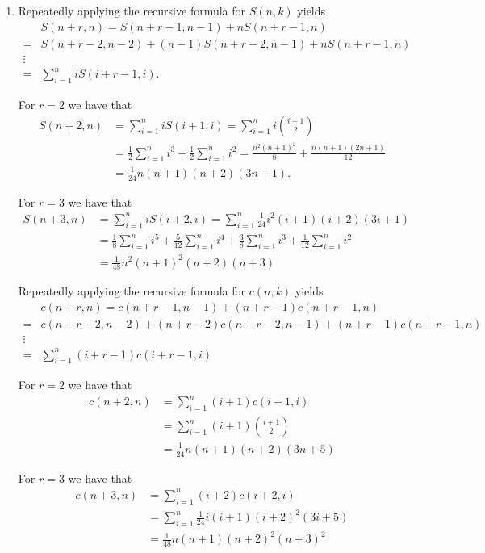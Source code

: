 \documentclass{article}
\begin{document}
\begin{enumerate}
      \item Repeatedly applying the recursive formula for $S(n, k)$ yields 
      \begin{align*}
         &S(n+r, n) = S(n+r-1, n-1) + nS(n+r-1, n) \\
         = &S(n+r-2, n-2) + (n-1)S(n+r-2, n-1) + nS(n+r-1, n) \\
         \vdots \\
         = &\sum_{i=1}^n i S(i+r-1 , i).
      \end{align*}

      For $r=2$ we have that 
      \begin{align*}
         S(n+2, n) 
         &= \sum_{i=1}^n i S(i+1 , i) 
            = \sum_{i=1}^n i \binom{i+1}{2} \\
         &= \frac{1}{2}\sum_{i=1}^n i^3 + \frac{1}{2} \sum_{i=1}^n i^2 
            = \frac{n^2(n+1)^2}{8} +  \frac{n(n+1)(2n+1)}{12} \\
         &= \frac{1}{24}n(n+1)(n+2)(3n+1).
      \end{align*}

      For $r=3$ we have that 
      \begin{align*}
         S(n+3, n) 
         &= \sum_{i=1}^n i S(i+2 , i) 
            = \sum_{i=1}^n \frac{1}{24}i^2(i+1)(i+2)(3i+1) \\
         &= \frac{1}{8}\sum_{i=1}^n i^5 + \frac{5}{12} \sum_{i=1}^n i^4
            + \frac{3}{8}\sum_{i=1}^n i^3 + \frac{1}{12} \sum_{i=1}^n i^2 \\
         &= \frac{1}{48}n^2(n+1)^2(n+2)(n+3)
      \end{align*}

      Repeatedly applying the recursive formula for $c(n, k)$ yields 
      \begin{align*}
         &c(n+r, n) = c(n+r-1, n-1) + (n+r-1)c(n+r-1, n) \\
         = &c(n+r-2, n-2) + (n+r-2)c(n+r-2, n-1) + (n+r-1)c(n+r-1, n) \\
         \vdots \\
         = &\sum_{i=1}^{n} (i+r-1) c(i+r-1 , i)
      \end{align*}

      For $r=2$ we have that 
      \begin{align*}
         c(n+2, n) &= \sum_{i=1}^{n} (i+1) c(i+1, i) \\
         &= \sum_{i=1}^{n} (i+1) \binom{i+1}{2} \\
         &= \frac{1}{24}n(n+1)(n+2)(3n+5)
      \end{align*}

      For $r=3$ we have that 
      \begin{align*}
         c(n+3, n) &= \sum_{i=1}^{n} (i+2)c(i+2 , i) \\
         &= \sum_{i=1}^{n} \frac{1}{24}i(i+1)(i+2)^2(3i+5) \\
         &= \frac{1}{48}n(n+1)(n+2)^2(n+3)^2
      \end{align*}
   \end{enumerate}
\newpage
\end{document}
